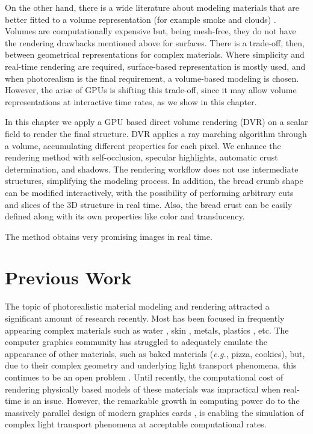 On the other hand, there is a wide literature about modeling materials that are better fitted to a volume representation (for example smoke and clouds) \cite{Chentanez2011,Zhou2008}.
Volumes are computationally expensive but, being mesh-free, they do not have the rendering drawbacks mentioned above for surfaces.
There is a trade-off, then, between geometrical representations for complex materials.
Where simplicity and real-time rendering are required, surface-based representation is mostly used, and when photorealism is the final requirement, a volume-based modeling is chosen.
However, the arise of GPUs is shifting this trade-off, since it may allow volume representations at interactive time rates, as we show in this chapter.

In this chapter we apply a GPU based direct volume rendering (DVR) \cite{Levoy1988,Kruger2003, Kratz2006} on a scalar field to render the final structure.
DVR applies a ray marching algorithm through a volume, accumulating different properties for each pixel.
We enhance the rendering method with self-occlusion, specular highlights, automatic crust determination, and shadows.
The rendering workflow does not use intermediate structures, simplifying the modeling process.
In addition, the bread crumb shape can be modified interactively, with the possibility of performing arbitrary cuts and slices of the 3D structure in real time.
Also, the bread crust can be easily defined along with its own properties like color and translucency.


The method obtains very promising images in real time.

\section{Previous Work}
The topic of photorealistic material modeling and rendering attracted a significant amount of research recently.
Most has been focused in frequently appearing complex materials such as water \cite{Schechter2012}, skin \cite{Donner2006}, metals, plastics \cite{Kurt2010}, etc.
The computer graphics community has struggled to adequately emulate the appearance of other materials, such as baked materials ({\em e.g.}, pizza, cookies), but, due to their complex geometry and underlying light transport phenomena, this continues to be an open problem \cite{Voglsam2013}.
Until recently, the computational cost of rendering physically based models of these materials was impractical when real-time is an issue.
However, the remarkable growth in computing power do to the massively parallel design of modern graphics cards \cite{Yeo09,Harris06}, is enabling the simulation of complex light transport phenomena at acceptable computational rates.


